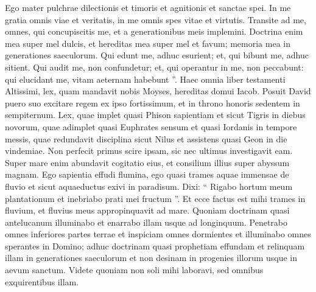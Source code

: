 \begin{biblechapter}
\begin{biblechapter}
\begin{biblechapter}
\begin{biblechapter}
\begin{biblechapter}
\begin{biblechapter}
\begin{biblechapter}
\begin{biblechapter}
\begin{biblechapter}
\begin{biblechapter}
\begin{biblechapter}
\begin{biblechapter}
\begin{biblechapter}
\begin{biblechapter}
\begin{biblechapter}
\begin{biblechapter}
\begin{biblechapter}
\begin{biblechapter}
\begin{biblechapter}
\begin{biblechapter}
\begin{biblechapter}
\begin{biblechapter}
\begin{biblechapter}
\begin{biblechapter}
 \verse Ego mater pulchrae dilectionis et timoris
 et agnitionis et sanctae spei.
 \verse In me gratia omnis viae et veritatis,
 in me omnis spes vitae et virtutis.
 \verse Transite ad me, omnes, qui concupiscitis me,
 et a generationibus meis implemini.
 \verse Doctrina enim mea super mel dulcis, et hereditas mea super mel et favum;
 \verse memoria mea in generationes saeculorum.
 \verse Qui edunt me, adhuc esurient;
 et, qui bibunt me, adhuc sitient.
 \verse Qui audit me, non confundetur;
 et, qui operantur in me, non peccabunt:
 \verse qui elucidant me, vitam aeternam habebunt ”.
 \verse Haec omnia liber testamenti Altissimi,
 \verse lex, quam mandavit nobis Moyses,
 hereditas domui Iacob.
 \verse Posuit David puero suo excitare regem ex ipso fortissimum,
 et in throno honoris sedentem in sempiternum.
 \verse Lex, quae implet quasi Phison sapientiam
 et sicut Tigris in diebus novorum,
 \verse quae adimplet quasi Euphrates sensum
 et quasi Iordanis in tempore messis,
 \verse quae redundavit disciplina sicut Nilus
 et assistens quasi Geon in die vindemiae.
 \verse Non perfecit primus scire ipsam,
 sic nec ultimus investigavit eam.
 \verse Super mare enim abundavit cogitatio eius,
 et consilium illius super abyssum magnam.
 \verse Ego sapientia effudi flumina,
 \verse ego quasi trames aquae immensae de fluvio
 et sicut aquaeductus exivi in paradisum.
 \verse Dixi: “ Rigabo hortum meum plantationum
 et inebriabo prati mei fructum ”.
 \verse Et ecce factus est mihi trames in fluvium,
 et fluvius meus appropinquavit ad mare.
 \verse Quoniam doctrinam quasi antelucanum illuminabo
 et enarrabo illam usque ad longinquum.
 \verse Penetrabo omnes inferiores partes terrae
 et inspiciam omnes dormientes
 et illuminabo omnes sperantes in Domino;
 \verse adhuc doctrinam quasi prophetiam effundam
 et relinquam illam in generationes saeculorum
 et non desinam in progenies illorum usque in aevum sanctum.
 \verse Videte quoniam non soli mihi laboravi,
 sed omnibus exquirentibus illam.
 

\end{biblechapter}
\end{biblechapter}
\end{biblechapter}
\end{biblechapter}
\end{biblechapter}
\end{biblechapter}
\end{biblechapter}
\end{biblechapter}
\end{biblechapter}
\end{biblechapter}
\end{biblechapter}
\end{biblechapter}
\end{biblechapter}
\end{biblechapter}
\end{biblechapter}
\end{biblechapter}
\end{biblechapter}
\end{biblechapter}
\end{biblechapter}
\end{biblechapter}
\end{biblechapter}
\end{biblechapter}
\end{biblechapter}
\end{biblechapter}
